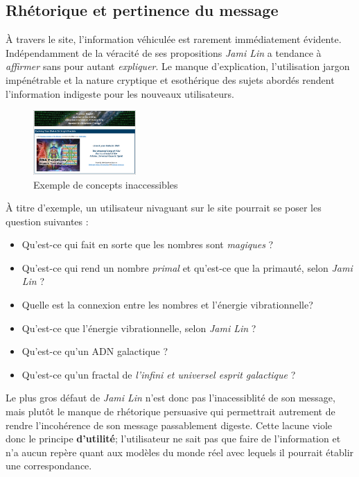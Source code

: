 \documentclass[9pt]{report}
\begin{document}
\begin{multicols*}{2}
  \subsection{Rhétorique et pertinence du message}
  À travers le site, l'information véhiculée est rarement immédiatement 
  évidente. Indépendamment de la véracité de ses propositions
  \textit{\textit{Jami Lin}}  a tendance à \textit{affirmer} sans pour 
  autant \textit{expliquer}. Le manque d'explication, l'utilisation 
  jargon impénétrable et la nature cryptique et esothérique 
  des sujets abordés rendent l'information indigeste pour les nouveaux 
  utilisateurs. 
  \begin{figure}[H]
    \begin{center}
      \includegraphics[width=0.35\textwidth]{PertinenceMessage.png}
    \end{center}
    \caption{Exemple de concepts inaccessibles}
  \end{figure} 
  À titre d'exemple, un utilisateur nivaguant sur le site pourrait 
  se poser les question suivantes : 
  \begin{itemize}
    \item Qu'est-ce qui fait en sorte que les nombres sont \textit{magiques} ?   
    \item Qu'est-ce qui rend un nombre \textit{primal} et qu'est-ce 
      que la primauté, selon \textit{\textit{Jami Lin}} ?
    \item Quelle est la connexion entre les nombres et l'énergie vibrationnelle?
    \item Qu'est-ce que l'énergie vibrationnelle, selon \textit{\textit{Jami Lin}} ?  
    \item Qu'est-ce qu'un ADN galactique ?
    \item Qu'est-ce qu'un fractal de \textit{l'infini et universel esprit galactique} ?  
  \end{itemize}

  Le plus gros défaut de \textit{\textit{Jami Lin}} n'est donc pas 
  l'inacessiblité de son message, mais plutôt le manque 
  de rhétorique persuasive qui permettrait autrement de 
  rendre l'incohérence de son message passablement digeste. Cette 
  lacune viole donc le principe \textbf{d'utilité}; l'utilisateur 
  ne sait pas que faire de l'information et n'a aucun repère 
  quant aux modèles du monde réel avec lequels il pourrait 
  établir une correspondance. 


\end{multicols*}
\end{document}
